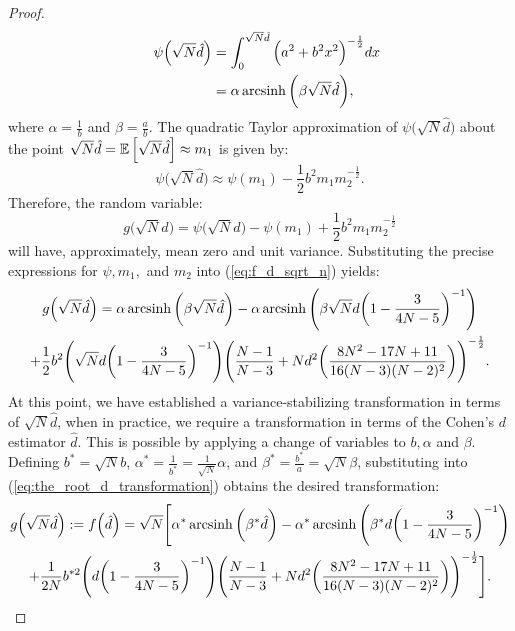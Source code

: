 \begin{proof}
\begin{alignat}{4}
\label{eq:variance_stabilizing_result}
&&\psi\Big(\sqrt{N}\hat{d}\Big)
&= \int_{0}^{\sqrt{N}\hat{d}} \Big(a^{2} + b^{2} x^{2}\Big)^{-\frac{1}{2}} dx \notag\\
&
&
&=  \alpha \operatorname{arcsinh}\bigg({\beta \sqrt{N} \hat{d}}\bigg),
\end{alignat}
where $\alpha = \frac{1}{b}$ and $\beta = \frac{a}{b}.$ The quadratic Taylor approximation of $\psi\Big(\sqrt{N}\hat{d}\Big)$ about the point $\sqrt{N}\hat{d} =  \operatorname*{\mathbb{E}}\Big[\sqrt{N}\hat{d}\Big] \approx m_1$ is given by:
\begin{equation}
\label{eq:quadratic taylor approximation}
\psi\Big(\sqrt{N}\hat{d}\Big) \approx \psi(m_{1}) - \frac{1}{2}b^{2}m_{1}m_{2}^{-\frac{1}{2}}.
\end{equation}
Therefore, the random variable:
\begin{equation}
\label{eq:f_d_sqrt_n}
g\Big(\sqrt{N}\hat{d}\Big) = \psi\Big(\sqrt{N}\hat{d}\Big) - \psi(m_{1}) + \frac{1}{2}b^{2}m_{1}m_{2}^{-\frac{1}{2}}        
\end{equation}
will have, approximately, mean zero and unit variance. Substituting the precise expressions for $\psi, m_{1},$ and $m_{2}$  into (\ref{eq:f_d_sqrt_n}) yields:
\begin{multline}
\label{eq:the_root_d_transformation}
    g\Big(\sqrt{N}\hat{d}\Big) = \alpha \operatorname{arcsinh}\bigg({\beta \sqrt{N} \hat{d}}\bigg) - \alpha \operatorname{arcsinh}\Bigg({\beta \sqrt{N} d} \bigg(1 - \frac{3}{4N - 5}\bigg)^{-1} \Bigg) \\
    + \frac{1}{2}b^{2}\Bigg(\sqrt{N}d \bigg(1 - \frac{3}{4N - 5}\bigg)^{-1} \Bigg)\Bigg(\frac{N-1}{N-3} + N d^{2} \bigg(\frac{8N^{2} - 17N + 11}{16(N-3)(N-2)^{2}} \bigg)\Bigg)^{-\frac{1}{2}}.
\end{multline}
At this point, we have established a variance-stabilizing transformation in terms of $\sqrt{N}\hat{d}$, when in practice, we require a transformation in terms of the Cohen's $d$ estimator $\hat{d}$. This is possible by applying a change of variables to $b,\alpha$ and $\beta$. Defining $b^{*} = \sqrt{N}b$, $\alpha^{*} = \frac{1}{b^{*}} = \frac{1}{\sqrt{N}}\alpha$, and $\beta^{*} = \frac{b^{*}}{a} = \sqrt{N}\beta$, substituting into (\ref{eq:the_root_d_transformation}) obtains the desired transformation:
\begin{multline}
\label{eq:the_final_transformation}
    g\Big(\sqrt{N}\hat{d}\Big) := f\Big(\hat{d}\Big) = \sqrt{N} \Bigg[\alpha^{*} \operatorname{arcsinh}\bigg({\beta^{*} \hat{d}}\bigg) - \alpha^{*} \operatorname{arcsinh}\Bigg({\beta^{*} d} \bigg(1 - \frac{3}{4N - 5}\bigg)^{-1} \Bigg) \\
                + \frac{1}{2N}b^{*2}\Bigg(d \bigg(1 - \frac{3}{4N - 5}\bigg)^{-1} \Bigg)\Bigg(\frac{N-1}{N-3} + N d^{2} \bigg(\frac{8N^{2} - 17N + 11}{16(N-3)(N-2)^{2}} \bigg)\Bigg)^{-\frac{1}{2}} \Bigg].
\end{multline}
\end{proof}
